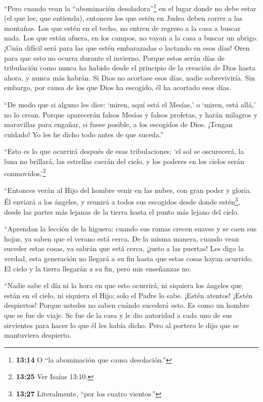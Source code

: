  ``Pero cuando vean la ``abominación
desoladora''\footnote{\textbf{13:14} O ``la abominación que causa
  desolación.''} en el lugar donde no debe estar (el que lee, que
entienda), entonces los que estén en Judea deben correr a las montañas.
 Los que estén en el techo, no entren de regreso a la casa
a buscar nada.  Los que están afuera, en los campos, no
vayan a la casa a buscar un abrigo.  ¡Cuán difícil será
para las que estén embarazadas o lactando en esos días! 
Oren para que esto no ocurra durante el invierno.  Porque
estos serán días de tribulación como nunca ha habido desde el principio
de la creación de Dios hasta ahora, y nunca más habrán.  Si
Dios no acortase esos días, nadie sobreviviría. Sin embargo, por causa
de los que Dios ha escogido, él ha acortado esos días.

 ``De modo que si alguno les dice: `miren, aquí está el
Mesías,' o `miren, está allá,' no lo crean.  Porque
aparecerán falsos Mesías y falsos profetas, y harán milagros y
maravillas para engañar, si fuese posible, a los escogidos de Dios.
 ¡Tengan cuidado! Yo les he dicho todo antes de que
suceda.''

 ``Esto es lo que ocurrirá después de esas tribulaciones:
`el sol se oscurecerá, la luna no brillará,  las estrellas
caerán del cielo, y los poderes en los cielos serán
conmovidos.'\footnote{\textbf{13:25} Ver Isaías 13:10.}

 ``Entonces verán al Hijo del hombre venir en las nubes,
con gran poder y gloria.  Él enviará a los ángeles, y
reunirá a todos sus escogidos desde donde estén\footnote{\textbf{13:27}
  Literalmente, ``por los cuatro vientos.''}, desde las partes más
lejanas de la tierra hasta el punto más lejano del cielo.

 ``Aprendan la lección de la higuera: cuando sus ramas
crecen suaves y se caen sus hojas, ya saben que el verano está cerca.
 De la misma manera, cuando vean suceder estas cosas, ya
sabrán que está cerca, ¡justo a las puertas!  Les digo la
verdad, esta generación no llegará a su fin hasta que estas cosas hayan
ocurrido.  El cielo y la tierra llegarán a su fin, pero mis
enseñanzas no.

 ``Nadie sabe el día ni la hora en que esto ocurrirá, ni
siquiera los ángeles que están en el cielo, ni siquiera el Hijo; solo el
Padre lo sabe.  ¡Estén atentos! ¡Estén despiertos! Porque
ustedes no saben cuándo sucederá esto.  Es como un hombre
que se fue de viaje. Se fue de la casa y le dio autoridad a cada uno de
sus sirvientes para hacer lo que él les había dicho. Pero al portero le
dijo que se mantuviera despierto.

